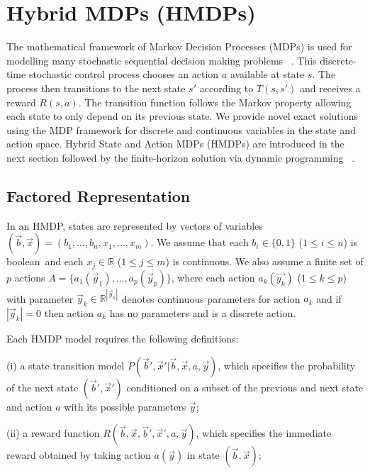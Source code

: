 \documentclass[twoside,11pt]{article}
\begin{document}
\section{Hybrid MDPs (HMDPs)}
The mathematical framework of Markov Decision Processes (MDPs) is used for modelling many stochastic sequential decision making problems ~\cite{bellman}. This discrete-time stochastic control process chooses an action $a$ available at state $s$. The process then transitions to the next state $s'$ according to $T(s,s')$ and receives a reward $R(s,a)$. The transition function follows the Markov property allowing each state to only depend on its previous state.  We provide novel exact solutions using the MDP framework for discrete and continuous variables in the state and action space. Hybrid State and Action MDPs (HMDPs) are introduced in the next section followed by the finite-horizon solution via dynamic programming ~\cite{li05}.
\subsection{Factored Representation}
\label{sec:HMDPs}
In an HMDP, states are represented by vectors of variables
$(\vec{b},\vec{x}) = ( b_1,\ldots,b_n,x_{1},\ldots,x_m )$.  We assume
that each $b_i \in \{ 0,1 \}$ ($1 \leq i \leq n$) is boolean$\,$
and each $x_j \in \mathbb{R}$ ($1 \leq j \leq
m$) is continuous.  We also assume a finite set of $p$ actions 
$A = \{a_{1}(\vec{y}_1), \ldots, a_{p}(\vec{y}_p)\}$, where each action $a_k(\vec{y_k})$ ($1
\leq k \leq p$)  with parameter $\vec{y}_k \in \mathbb{R}^{|\vec{y}_k|}$  denotes continuous parameters for 
action $a_{k}$ and  if $|\vec{y}_k|=0$ then action $a_{k}$ has no parameters and is a discrete action.

Each HMDP model requires the following definitions: 

(i) a state transition model $P(\vec{b}',\vec{x}'|\vec{b},\vec{x},a,\vec{y})$, which specifies the
probability of the next state $(\vec{b}',\vec{x}')$ conditioned on a
subset of the previous and next state and action $a$ with its possible parameters $\vec{y}$; 

(ii) a reward function $R(\vec{b},\vec{x},\vec{b}',\vec{x}',a,\vec{y})$, which specifies the immediate reward obtained by taking action $a(\vec{y})$ in state $(\vec{b},\vec{x})$; 
\end{document}
